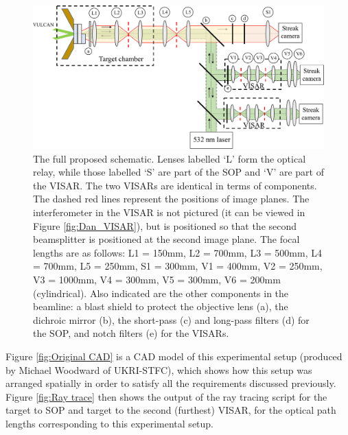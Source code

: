 \begin{figure}
	\centering
\includegraphics[width=1.0\textwidth]{figures/Experiment/Full Experiment Schematic.pdf}%
\caption{\label{fig:Full experiment schematic} The full proposed schematic. Lenses labelled `L' form the optical relay, while those labelled `S' are part of the SOP and `V' are part of the VISAR. The two VISARs are identical in terms of components. The dashed red lines represent the positions of image planes. The interferometer in the VISAR is not pictured (it can be viewed in Figure \ref{fig:Dan_VISAR}), but is positioned so that the second beamsplitter is positioned at the second image plane. The focal lengths are as follows: L1 = 150mm, L2 = 700mm, L3 = 500mm, L4 = 700mm, L5 = 250mm, S1 = 300mm, V1 = 400mm, V2 = 250mm, V3 = 1000mm, V4 = 300mm, V5 = 300mm, V6 = 200mm (cylindrical). Also indicated are the other components in the beamline: a blast shield to protect the objective lens (a), the dichroic mirror (b), the short-pass (c) and long-pass filters (d) for the SOP, and notch filters (e) for the VISARs.}
\end{figure}

Figure \ref{fig:Original CAD} is a CAD model of this experimental setup (produced by Michael Woodward of UKRI-STFC), which shows how this setup was arranged spatially in order to satisfy all the requirements discussed previously. Figure \ref{fig:Ray trace} then shows the output of the ray tracing script for the target to SOP and target to the second (furthest) VISAR, for the optical path lengths corresponding to this experimental setup. 


